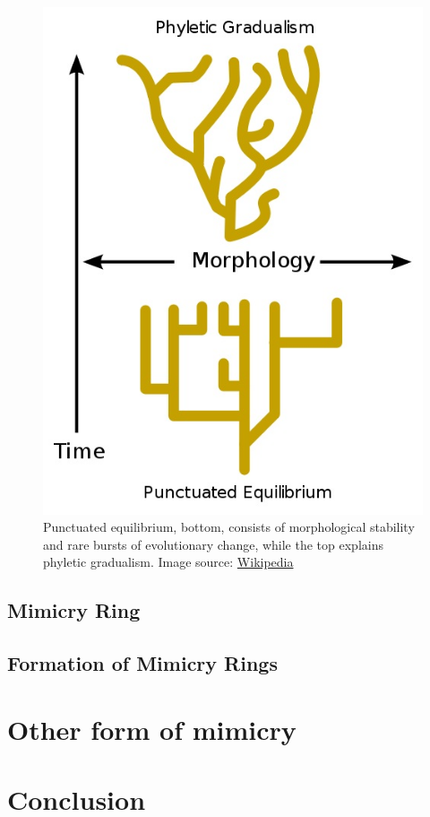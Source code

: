 \begin{figure}[H]
	\centering
	\includegraphics[scale=0.5]{images/Punctuated-equilibrium}
	\caption{Punctuated equilibrium, bottom, consists of morphological stability and rare bursts of evolutionary change, while the top explains phyletic gradualism. Image source: \href{http://en.wikipedia.org/wiki/Punctuated_equilibrium}{Wikipedia}}
	\label{fig:punctuated-equilibrium}
\end{figure}



\subsection{Mimicry Ring}

\subsection{Formation of Mimicry Rings}

\section{Other form of mimicry}

\section{Conclusion}